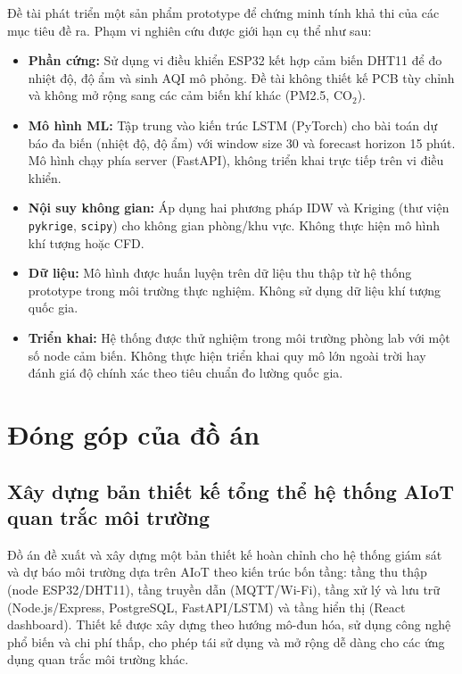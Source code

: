 Đề tài phát triển một sản phẩm prototype để chứng minh tính khả thi của
các mục tiêu đề ra. Phạm vi nghiên cứu được giới hạn cụ thể như sau:

\begin{itemize}[leftmargin=2cm]
  \item \textbf{Phần cứng:} Sử dụng vi điều khiển ESP32 kết hợp cảm
    biến DHT11 để đo nhiệt độ, độ ẩm và sinh AQI mô phỏng. Đề tài không thiết kế PCB tùy
    chỉnh và không mở rộng sang các cảm biến khí khác (PM2.5, CO$_2$).

  \item \textbf{Mô hình ML:} Tập trung vào kiến trúc LSTM (PyTorch) cho
    bài toán dự báo đa biến (nhiệt độ, độ ẩm) với window size 30 và
    forecast horizon 15 phút. Mô hình chạy phía server (FastAPI), không
    triển khai trực tiếp trên vi điều khiển.

  \item \textbf{Nội suy không gian:} Áp dụng hai phương pháp IDW và
    Kriging (thư viện \texttt{pykrige}, \texttt{scipy}) cho không gian
    phòng/khu vực. Không thực hiện mô hình khí tượng hoặc CFD.

  \item \textbf{Dữ liệu:} Mô hình được huấn luyện trên dữ liệu thu
    thập từ hệ thống prototype trong môi trường thực nghiệm. Không sử
    dụng dữ liệu khí tượng quốc gia.

  \item \textbf{Triển khai:} Hệ thống được thử nghiệm trong môi trường
    phòng lab với một số node cảm biến. Không thực hiện triển khai quy
    mô lớn ngoài trời hay đánh giá độ chính xác theo tiêu chuẩn đo
    lường quốc gia.
\end{itemize}

\section{Đóng góp của đồ án}
\label{sec:intro:contribution}

\subsection{Xây dựng bản thiết kế tổng thể hệ thống AIoT quan trắc
môi trường}
\label{subsec:intro:contrib1}

Đồ án đề xuất và xây dựng một bản thiết kế hoàn chỉnh cho hệ thống
giám sát và dự báo môi trường dựa trên AIoT theo kiến trúc bốn tầng:
tầng thu thập (node ESP32/DHT11), tầng truyền dẫn (MQTT/Wi-Fi), tầng
xử lý và lưu trữ (Node.js/Express, PostgreSQL, FastAPI/LSTM) và tầng
hiển thị (React dashboard). Thiết kế được xây dựng theo hướng mô-đun
hóa, sử dụng công nghệ phổ biến và chi phí thấp, cho phép tái sử dụng
và mở rộng dễ dàng cho các ứng dụng quan trắc môi trường khác.

